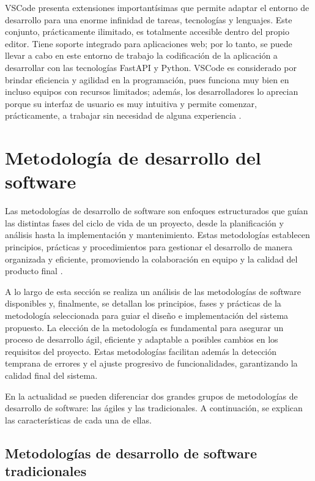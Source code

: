 VSCode presenta extensiones importantísimas que permite adaptar el
entorno de desarrollo para una enorme infinidad de tareas, tecnologías y lenguajes. 
Este conjunto, prácticamente ilimitado, es totalmente accesible
dentro del propio editor. Tiene soporte integrado para aplicaciones web;
por lo tanto, se puede llevar a cabo en este entorno de trabajo la
codificación de la aplicación a desarrollar con las tecnologías FastAPI y
Python. VSCode es considerado por brindar eficiencia y agilidad en la
programación, pues funciona muy bien en incluso equipos con recursos
limitados; además, los desarrolladores lo aprecian porque su interfaz de
usuario es muy intuitiva y permite comenzar, prácticamente, a trabajar sin
necesidad de alguna experiencia \citep{vscode2025, vscode_docs2025}.

\section{Metodología de desarrollo del software}

Las metodologías de desarrollo de software son enfoques estructurados que guían 
las distintas fases del ciclo de vida de un proyecto, desde la planificación y análisis 
hasta la implementación y mantenimiento. Estas metodologías establecen principios, prácticas 
y procedimientos para gestionar el desarrollo de manera organizada y eficiente, 
promoviendo la colaboración en equipo y la calidad del producto final 
\citep{pacienzia2015metodologias}. 
    
A lo largo de esta sección se realiza un análisis de las metodologías de 
software disponibles y, finalmente, se detallan los principios, fases y prácticas 
de la metodología seleccionada para guiar el diseño e implementación del sistema 
propuesto. La elección de la metodología es fundamental para asegurar un proceso 
de desarrollo ágil, eficiente y adaptable a posibles cambios en los requisitos del 
proyecto. Estas metodologías facilitan además la detección temprana de errores y el 
ajuste progresivo de funcionalidades, garantizando la calidad final del sistema.
    
En la actualidad se pueden diferenciar dos grandes grupos de metodologías de 
desarrollo de software: las ágiles y las tradicionales. A continuación, se explican 
las características de cada una de ellas.
    
\subsection{Metodologías de desarrollo de software tradicionales}
    
